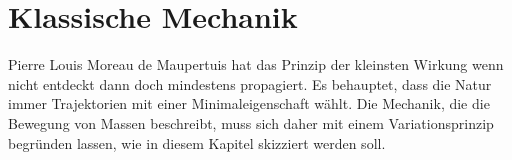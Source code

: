 %
%
%
\chapter{Klassische Mechanik
\label{buch:chapter:mechanik}}
Pierre Louis Moreau de Maupertuis hat das Prinzip der kleinsten
Wirkung wenn nicht entdeckt dann doch mindestens propagiert.
Es behauptet, dass die Natur immer Trajektorien mit einer
Minimaleigenschaft wählt.
Die Mechanik, die die Bewegung von Massen beschreibt, muss sich
daher mit einem Variationsprinzip begründen lassen, wie in diesem
Kapitel skizziert werden soll.





